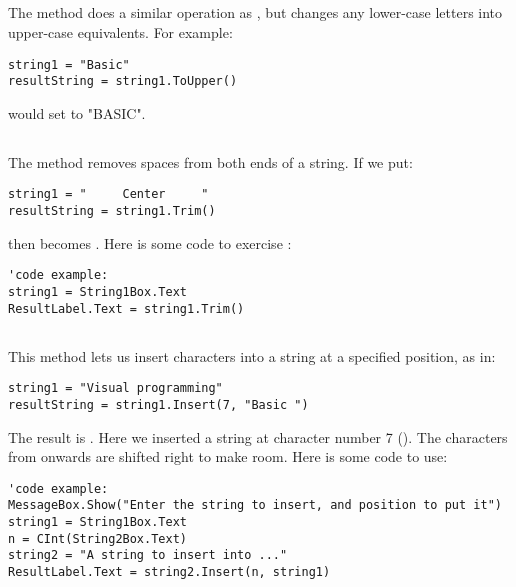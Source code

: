 		\subsection*{}
			The  method does a similar operation as , but changes any lower-case letters into upper-case equivalents. For example:
			\begin{lstlisting}
string1 = "Basic"
resultString = string1.ToUpper()
			\end{lstlisting}
			would set  to "BASIC".

		\subsection*{}
			The  method removes spaces from both ends of a string. If we put:
			\begin{lstlisting}
string1 = "     Center     "
resultString = string1.Trim()
			\end{lstlisting}
			then  becomes . Here is some code to exercise :
			\begin{lstlisting}
'code example:
string1 = String1Box.Text
ResultLabel.Text = string1.Trim()
			\end{lstlisting}

		\subsection*{}
			This method lets us insert characters into a string at a specified position, as in:
			\begin{lstlisting}
string1 = "Visual programming"
resultString = string1.Insert(7, "Basic ")
			\end{lstlisting}
			The result is . Here we inserted a string at character number 7 (). The characters from  onwards are shifted right to make room. Here is some code to use:
			\begin{lstlisting}
'code example:
MessageBox.Show("Enter the string to insert, and position to put it")
string1 = String1Box.Text
n = CInt(String2Box.Text)
string2 = "A string to insert into ..."
ResultLabel.Text = string2.Insert(n, string1)
			\end{lstlisting}

